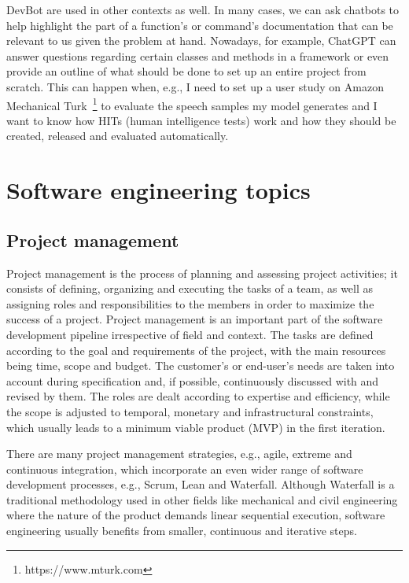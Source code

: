 \documentclass[11pt]{article}
\begin{document}
DevBot are used in other contexts as well. In many cases, we can ask chatbots to help highlight the part of a function's or command's documentation that can be relevant to us given the problem at hand. Nowadays, for example, ChatGPT can answer questions regarding certain classes and methods in a framework or even provide an outline of what should be done to set up an entire project from scratch. This can happen when, e.g., I need to set up a user study on Amazon Mechanical Turk~\footnote{https://www.mturk.com} to evaluate the speech samples my model generates and I want to know how HITs (human intelligence tests) work and how they should be created, released and evaluated automatically.

\section{Software engineering topics}

\subsection{Project management}

Project management is the process of planning and assessing project activities; it consists of defining, organizing and executing the tasks of a team, as well as assigning roles and responsibilities to the members in order to maximize the success of a project. Project management is an important part of the software development pipeline irrespective of field and context. The tasks are defined according to the goal and requirements of the project, with the main resources being time, scope and budget. The customer's or end-user's needs are taken into account during specification and, if possible, continuously discussed with and revised by them. The roles are dealt according to expertise and efficiency, while the scope is adjusted to temporal, monetary and infrastructural constraints, which usually leads to a minimum viable product (MVP) in the first iteration.

There are many project management strategies, e.g., agile, extreme and continuous integration, which incorporate an even wider range of software development processes, e.g., Scrum, Lean and Waterfall. Although Waterfall is a traditional methodology used in other fields like mechanical and civil engineering where the nature of the product demands linear sequential execution, software engineering usually benefits from smaller, continuous and iterative steps.
\end{document}
